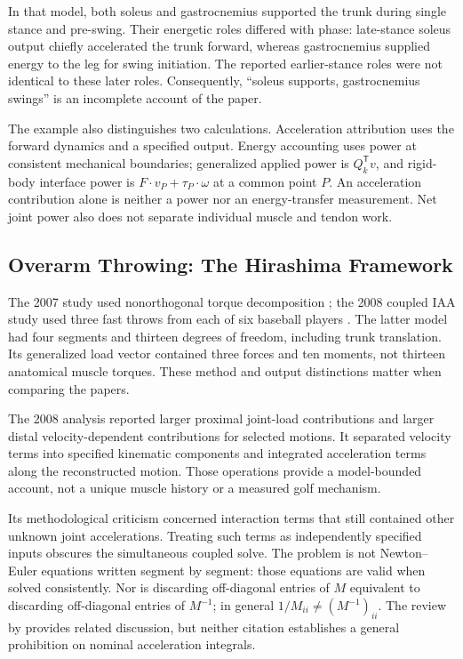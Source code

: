 In that model, both soleus and gastrocnemius supported the trunk during single stance and pre-swing. Their energetic roles differed with phase: late-stance soleus output chiefly accelerated the trunk forward, whereas gastrocnemius supplied energy to the leg for swing initiation. The reported earlier-stance roles were not identical to these later roles. Consequently, ``soleus supports, gastrocnemius swings'' is an incomplete account of the paper.

The example also distinguishes two calculations. Acceleration attribution uses the forward dynamics and a specified output. Energy accounting uses power at consistent mechanical boundaries; generalized applied power is $Q_k^{\mathsf T}v$, and rigid-body interface power is $F\cdot v_P+\tau_P\cdot\omega$ at a common point $P$. An acceleration contribution alone is neither a power nor an energy-transfer measurement. Net joint power also does not separate individual muscle and tendon work.

\subsection{Overarm Throwing: The Hirashima Framework}

The 2007 study used nonorthogonal torque decomposition \cite{Hirashima2007control}; the 2008 coupled IAA study used three fast throws from each of six baseball players \cite{Hirashima2008kinetic}. The latter model had four segments and thirteen degrees of freedom, including trunk translation. Its generalized load vector contained three forces and ten moments, not thirteen anatomical muscle torques. These method and output distinctions matter when comparing the papers.

The 2008 analysis reported larger proximal joint-load contributions and larger distal velocity-dependent contributions for selected motions. It separated velocity terms into specified kinematic components and integrated acceleration terms along the reconstructed motion. Those operations provide a model-bounded account, not a unique muscle history or a measured golf mechanism.

Its methodological criticism concerned interaction terms that still contained other unknown joint accelerations. Treating such terms as independently specified inputs obscures the simultaneous coupled solve. The problem is not Newton--Euler equations written segment by segment: those equations are valid when solved consistently. Nor is discarding off-diagonal entries of $M$ equivalent to discarding off-diagonal entries of $M^{-1}$; in general $1/M_{ii}\ne(M^{-1})_{ii}$. The review by \cite{HirashimaOhtsuki2008} provides related discussion, but neither citation establishes a general prohibition on nominal acceleration integrals.

